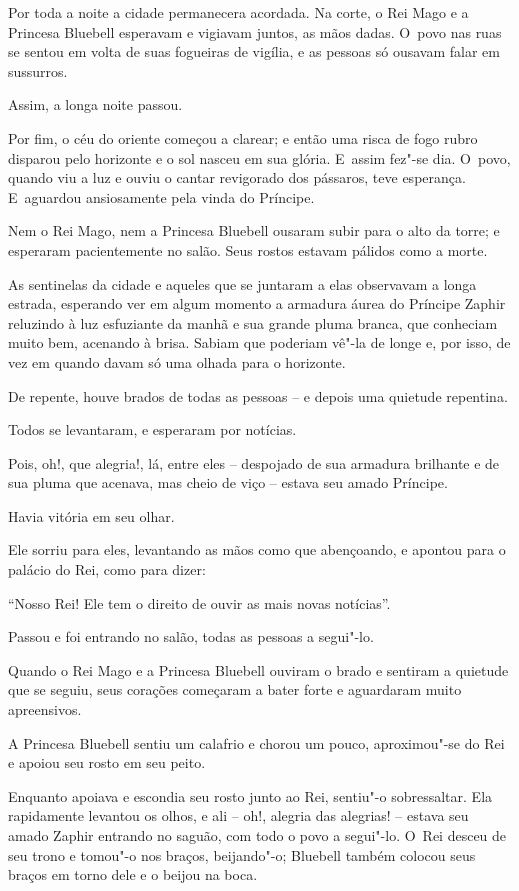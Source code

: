 Por toda a noite a cidade permanecera acordada. Na corte, o Rei Mago e a
Princesa Bluebell esperavam e vigiavam juntos, as mãos dadas. O~povo nas
ruas se sentou em volta de suas fogueiras de vigília, e as pessoas só
ousavam falar em sussurros.

Assim, a longa noite passou.

Por fim, o céu do oriente começou a clarear; e então uma risca de fogo
rubro disparou pelo horizonte e o sol nasceu em sua glória. E~assim
fez"-se dia. O~povo, quando viu a luz e ouviu o cantar revigorado dos
pássaros, teve esperança. E~aguardou ansiosamente pela vinda do
Príncipe.

Nem o Rei Mago, nem a Princesa Bluebell ousaram subir para o alto da
torre; e esperaram pacientemente no salão. Seus rostos estavam pálidos
como a morte.

As sentinelas da cidade e aqueles que se juntaram a elas observavam a
longa estrada, esperando ver em algum momento a armadura áurea do
Príncipe Zaphir reluzindo à luz esfuziante da manhã e sua grande pluma
branca, que conheciam muito bem, acenando à brisa. Sabiam que poderiam
vê"-la de longe e, por isso, de vez em quando davam só uma olhada para o
horizonte.

De repente, houve brados de todas as pessoas -- e depois uma quietude
repentina.

Todos se levantaram, e esperaram por notícias.

Pois, oh!, que alegria!, lá, entre eles -- despojado de sua armadura
brilhante e de sua pluma que acenava, mas cheio de viço -- estava seu
amado Príncipe.

Havia vitória em seu olhar.

Ele sorriu para eles, levantando as mãos como que abençoando, e apontou
para o palácio do Rei, como para dizer:

``Nosso Rei! Ele tem o direito de ouvir as mais novas notícias''.

Passou e foi entrando no salão, todas as pessoas a segui"-lo.

\smallskip
Quando o Rei Mago e a Princesa Bluebell ouviram o brado e sentiram a
quietude que se seguiu, seus corações começaram a bater forte e
aguardaram muito apreensivos.

A Princesa Bluebell sentiu um calafrio e chorou um pouco, aproximou"-se
do Rei e apoiou seu rosto em seu peito.

Enquanto apoiava e escondia seu rosto junto ao Rei, sentiu"-o
sobressaltar. Ela rapidamente levantou os olhos, e ali -- oh!, alegria
das alegrias! -- estava seu amado Zaphir entrando no saguão, com todo o
povo a segui"-lo. O~Rei desceu de seu trono e tomou"-o nos braços,
beijando"-o; Bluebell também colocou seus braços em torno dele e o beijou
na boca.

